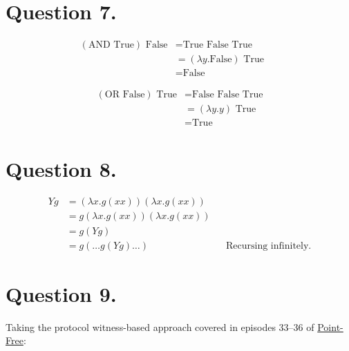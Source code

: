 \documentclass{article}
\begin{document}
\section*{Question 7.}

\begin{align*}
    (\textrm{AND True}) \textrm{ False} &= \textrm{True False True} && \\
    &= (\lambda y.\textrm{False}) \textrm{ True} && \\
    &= \textrm{False}
\end{align*}

\begin{align*}
    (\textrm{OR False}) \textrm{ True} &= \textrm{False False True} \\
    &= (\lambda y.y) \textrm{ True} \\
    &= \textrm{True}
\end{align*}

\section*{Question 8.}

\begin{align*}
    Y g &= (\lambda x.g(xx))(\lambda x.g(xx)) \\
    &= g(\lambda x.g(xx))(\lambda x.g(xx)) \\
    &= g(Y g) \\
    &= g(\ldots g(Yg)\ldots) && \text{Recursing infinitely.}
\end{align*}

\section*{Question 9.}

Taking the protocol witness-based approach covered in episodes 33–36 of \href{https://www.pointfree.co/episodes/ep33-protocol-witnesses-part-1}{Point-Free}:
\end{document}
